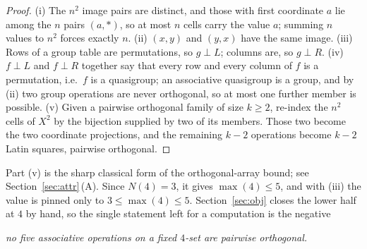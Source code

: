 \documentclass[11pt]{amsart}
\theoremstyle{remark}
\theoremstyle{definition}
\newcommand{\Nmols}{N}
\begin{document}
\begin{proof}
(i) The $n^2$ image pairs are distinct, and those with first coordinate $a$ lie among the $n$ pairs
$(a,\ast)$, so at most $n$ cells carry the value $a$; summing $n$ values to $n^2$ forces exactly
$n$. (ii) $(x,y)$ and $(y,x)$ have the same image. (iii) Rows of a group table are permutations, so
$g\perp L$; columns are, so $g\perp R$. (iv) $f\perp L$ and $f\perp R$ together say that every row
and every column of $f$ is a permutation, i.e.\ $f$ is a quasigroup; an associative quasigroup is a
group, and by (ii) two group operations are never orthogonal, so at most one further member is
possible. (v) Given a pairwise orthogonal family of size $k\ge2$, re-index the $n^2$ cells of $X^2$
by the bijection supplied by two of its members. Those two become the two coordinate projections,
and the remaining $k-2$ operations become $k-2$ Latin squares, pairwise orthogonal.
\end{proof}

Part (v) is the sharp classical form of the orthogonal-array bound; see
Section~\ref{sec:attr}\,(A). Since $\Nmols(4)=3$, it gives $\max(4)\le5$, and with (iii) the value
is pinned only to $3\le\max(4)\le5$. Section~\ref{sec:obj} closes the lower half at $4$ by hand, so
the single statement left for a computation is the negative

\begin{center}
\emph{no five associative operations on a fixed $4$-set are pairwise orthogonal.}
\end{center}
\end{document}
